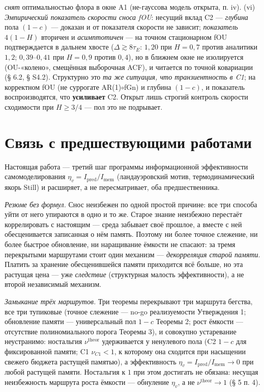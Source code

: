 \documentclass[12pt]{iopart}
\begin{document}
\emph{снят} оптимальностью флора в окне A1 (не-гауссова модель открыта, п. iv). (vi) \emph{Эмпирический показатель скорости сноса fOU}: несущий вклад C2 --- \emph{глубина} пола \((1-c)\) --- доказан и от показателя скорости не зависит; \emph{показатель} \(4(1-H)\) вторичен и \emph{асимптотичен} --- на точном стационарном fOU подтверждается в дальнем хвосте (\(\Delta \gtrsim 8\tau_E\): \(1{,}20\) при \(H = 0{,}7\) против аналитики \(1{,}2\); \(0{,}39\)--\(0{,}41\) при \(H = 0{,}9\) против \(0{,}4\)), но в ближнем окне не изолируется (OU-«колено», смещённая выборочная ACF), и читается по точной ковариации (§ 6.2, § S4.2). Структурно это \emph{та же ситуация, что транзиентность в C1}; на корректном fOU (не суррогате AR(1)\(\circ\)fGn) и глубина \((1-c)\), и показатель воспроизводятся, что \textbf{усиливает} C2. Открыт лишь строгий контроль скорости сходимости при \(H \ge 3/4\) --- пол это не подрывает.



\section{Связь с предшествующими работами}\label{ux441ux432ux44fux437ux44c-ux441-ux43fux440ux435ux434ux448ux435ux441ux442ux432ux443ux44eux449ux438ux43cux438-ux440ux430ux431ux43eux442ux430ux43cux438}



Настоящая работа --- третий шаг программы информационной эффективности самомоделирования \(\eta_v = I_{\text{pred}}/I_{\text{mem}}\) (ландауэровский мотив, термодинамический якорь Still) и расширяет, а не пересматривает, оба предшественника.



\emph{Резюме без формул.} Снос неизбежен по одной простой причине: все три способа уйти от него упираются в одно и то же. Старое знание неизбежно перестаёт коррелировать с настоящим --- среда забывает своё прошлое, а вместе с ней обесценивается записанная о нём память. Поэтому ни более точное слежение, ни более быстрое обновление, ни наращивание ёмкости не спасают: за тремя перекрытыми маршрутами стоит один механизм --- \emph{декорреляция старой памяти}. Платить за хранение обесценившейся памяти приходится всё больше, но эта растущая цена --- уже \emph{следствие} (структурная малость эффективности), а не второй независимый механизм.



\emph{Замыкание трёх маршрутов.} Три теоремы перекрывают три маршрута бегства, все три тупиковые (точное слежение --- no-go реализуемости Утверждения 1; обновление памяти --- универсальный пол \(1-c\) Теоремы 2; рост ёмкости --- отсутствие полиномиального порога Теоремы 3), и совокупно устаревание неустранимо: ностальгия \(\nu^{\text{theor}}\) удерживается у ненулевого пола (C2 \(1-c\) для фиксированной памяти; C1 \(\nu_{C1} < 1\), к которому она сходится при насыщении свежего бюджета растущей памятью), а эффективность \(\eta_v = I_{\text{pred}}/I_{\text{mem}} \to 0\) при любой растущей памяти. Ностальгия к \(1\) при этом достигать не обязана: несущая неизбежность маршрута роста ёмкости --- обнуление \(\eta_v\), а не \(\nu^{\text{theor}} \to 1\) (§ 5 п. 4).
\end{document}
